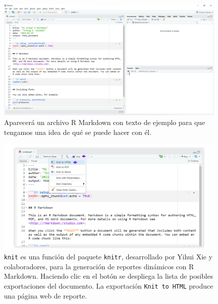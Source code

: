 \documentclass[
]{article}
\theoremstyle{definition}
\theoremstyle{definition}
\theoremstyle{definition}
\theoremstyle{definition}
\theoremstyle{remark}
\begin{document}
\begin{figure}

{\centering \includegraphics[width=1\linewidth]{figs/screenshots/abrir R Markdown 3} 

}

\caption{Aparecerá un archivo R Markdown con texto de ejemplo para que tengamos una idea de qué se puede hacer con él.}\label{fig:figura25}
\end{figure}



\begin{figure}

{\centering \includegraphics[width=1\linewidth]{figs/screenshots/abrir R Markdown 4} 

}

\caption{\texttt{knit} es una función del paquete \texttt{knitr}, desarrollado por Yihui Xie y colaboradores, para la generación de reportes dinámicos con R Markdown. Haciendo clic en el botón se despliega la lista de posibles exportaciones del documento. La exportación \texttt{Knit\ to\ HTML} produce una página web de reporte.}\label{fig:figura26}
\end{figure}
\end{document}
